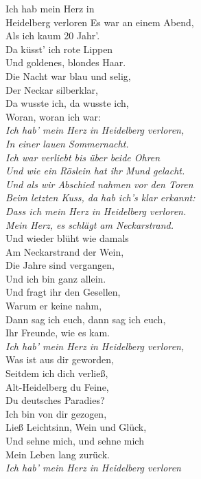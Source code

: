 %
\begin{lied***}{Ich hab mein Herz in\\Heidelberg verloren}
Es war an einem Abend,\\
Als ich kaum 20 Jahr'.\\
Da küsst' ich rote Lippen\\
Und goldenes, blondes Haar.\\
Die Nacht war blau und selig,\\
Der Neckar silberklar,\\
Da wusste ich, da wusste ich,\\
Woran, woran ich war:\\[-5pt]

\textit{Ich hab' mein Herz in Heidelberg verloren,\\
In einer lauen Sommernacht.\\
Ich war verliebt bis über beide Ohren\\
Und wie ein Röslein hat ihr Mund gelacht.\\
Und als wir Abschied nahmen vor den Toren\\
Beim letzten Kuss, da hab ich's klar erkannt:\\
Dass ich mein Herz in Heidelberg verloren.\\
Mein Herz, es schlägt am Neckarstrand.}\\[-5pt]

Und wieder blüht wie damals\\
Am Neckarstrand der Wein,\\
Die Jahre sind vergangen,\\
Und ich bin ganz allein.\\
Und fragt ihr den Gesellen,\\
Warum er keine nahm,\\
Dann sag ich euch, dann sag ich euch,\\
Ihr Freunde, wie es kam.\\[-5pt]

\textit{Ich hab' mein Herz in Heidelberg verloren,}\\[-5pt]

Was ist aus dir geworden,\\
Seitdem ich dich verließ,\\
Alt-Heidelberg du Feine,\\
Du deutsches Paradies?\\
Ich bin von dir gezogen,\\
Ließ Leichtsinn, Wein und Glück,\\
Und sehne mich, und sehne mich\\
Mein Leben lang zurück.\\[-5pt]

\textit{Ich hab' mein Herz in Heidelberg verloren}\end{lied***}